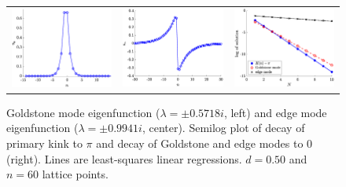 \documentclass[12pt,reqno]{amsart}
\begin{document}
\begin{figure}[H]
	\begin{center}
	\begin{tabular}{ccc}
	\includegraphics[width=5cm]{1kinkgoldstonemode.eps} &
	\includegraphics[width=5cm]{1kinkedgemode.eps} &
	\includegraphics[width=5cm]{decayplot.eps}
	\end{tabular}
	\end{center}
	\caption{Goldstone mode eigenfunction ($\lambda = \pm 0.5718 i$, left) and edge mode eigenfunction ($\lambda = \pm 0.9941 i$, center). Semilog plot of decay of primary kink to $\pi$ and decay of Goldstone and edge modes to 0 (right). Lines are least-squares linear regressions. $d = 0.50$ and $n =60$ lattice points. }
	\label{fig:kinkeig}
\end{figure}
\end{document}
